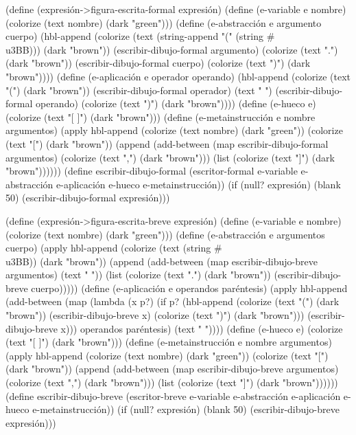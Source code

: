 \documentclass[10pt,oneside,openany,letterpaper]{book}
\begin{document}
(define (expresión->figura-escrita-formal expresión)
  (define (e-variable e nombre)
    (colorize (text nombre) (dark "green")))
  (define (e-abstracción e argumento cuerpo)
    (hbl-append (colorize (text (string-append "(" (string #\\u3BB))) (dark "brown"))
                (escribir-dibujo-formal argumento)
                (colorize (text ".") (dark "brown"))
                (escribir-dibujo-formal cuerpo)
                (colorize (text ")") (dark "brown"))))
  (define (e-aplicación e operador operando)
    (hbl-append (colorize (text "(") (dark "brown"))
                (escribir-dibujo-formal operador)
                (text " ")
                (escribir-dibujo-formal operando)
                (colorize (text ")") (dark "brown"))))
  (define (e-hueco e)
    (colorize (text "[ ]") (dark "brown")))
  (define (e-metainstrucción e nombre argumentos)
    (apply hbl-append
           (colorize (text nombre) (dark "green"))
           (colorize (text "[") (dark "brown"))
           (append (add-between (map escribir-dibujo-formal argumentos)
                                (colorize (text ",") (dark "brown")))
                   (list (colorize (text "]") (dark "brown"))))))
  (define escribir-dibujo-formal
    (escritor-formal e-variable e-abstracción e-aplicación
                     e-hueco e-metainstrucción))
  (if (null? expresión)
      (blank 50)
      (escribir-dibujo-formal expresión)))

(define (expresión->figura-escrita-breve expresión)
  (define (e-variable e nombre)
    (colorize (text nombre) (dark "green")))
  (define (e-abstracción e argumentos cuerpo)
    (apply hbl-append
           (colorize (text (string #\\u3BB)) (dark "brown"))
           (append (add-between (map escribir-dibujo-breve argumentos)
                                (text " "))
                   (list (colorize (text ".") (dark "brown"))
                         (escribir-dibujo-breve cuerpo)))))
  (define (e-aplicación e operandos paréntesis)
    (apply hbl-append
           (add-between (map (lambda (x p?)
                               (if p?
                                   (hbl-append (colorize (text "(") (dark "brown"))
                                               (escribir-dibujo-breve x)
                                               (colorize (text ")") (dark "brown")))
                                   (escribir-dibujo-breve x)))
                             operandos
                             paréntesis)
                        (text " "))))
  (define (e-hueco e)
    (colorize (text "[ ]") (dark "brown")))
  (define (e-metainstrucción e nombre argumentos)
    (apply hbl-append
           (colorize (text nombre) (dark "green"))
           (colorize (text "[") (dark "brown"))
           (append (add-between (map escribir-dibujo-breve argumentos)
                                (colorize (text ",") (dark "brown")))
                   (list (colorize (text "]") (dark "brown"))))))
  (define escribir-dibujo-breve
    (escritor-breve e-variable e-abstracción e-aplicación
                    e-hueco e-metainstrucción))
  (if (null? expresión)
      (blank 50)
      (escribir-dibujo-breve expresión)))
\end{document}
